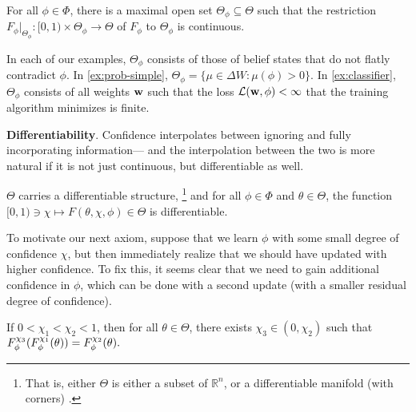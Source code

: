 \begin{prop}
	For all $\phi \in \Phi$,
	there is a maximal open set $\Theta_\phi \subseteq \Theta$ such that
	the restriction $F_{\phi} |_{\Theta_\phi} : [0,1) \times \Theta_\phi \to \Theta$
	of $F_\phi$ to $\Theta_\phi$ is continuous. 	
\end{prop}
In each of our examples, $\Theta_\phi$ consists of those
of belief states that do not flatly contradict $\phi$.
In \cref{ex:prob-simple}, $\Theta_\phi = \{ \mu \in \Delta W : \mu(\phi) > 0\}$.
In \cref{ex:classifier}, $\Theta_\phi$ consists of all weights $\mathbf{w}$ 
such that
the loss $\mathcal L(\mathbf{w}, \phi) < \infty$ that the training algorithm minimizes is finite.



\textbf{Differentiability}.
Confidence interpolates between ignoring and fully incorporating information---
and the interpolation between the two is more natural if it is not just 
continuous, but differentiable as well.

\begin{CFaxioms}
	\item \label{ax:diffble}
	$\Theta$
	carries a differentiable structure,
	\unskip\footnote{
		That is, either 
		$\Theta$ is either a subset of $\mathbb R^n$,
	 	or a differentiable manifold (with corners) 
		\parencite{lee2013smooth,joyce2009manifolds-w/corners}.}
	and for all $\phi \in \Phi$ and $\theta \in \Theta$, 
	the function $[0,1) \ni \chi \mapsto F(\theta,\chi,\phi) \in \Theta$
	is differentiable.
\end{CFaxioms}

To motivate our next axiom,
suppose that we learn $\phi$ with some small degree of confidence $\chi$,
but then immediately realize that we should have updated with higher confidence. 
To fix this, it seems clear that we need to gain additional confidence
in $\phi$, which can be done with a second update 
(with a smaller residual degree of confidence).

\begin{CFaxioms}
	\item 
	If $0 < \chi_1 < \chi_2 < 1$, 
	then for all $\theta \in \Theta$, 
	there exists 
	$\chi_3 \in (0,\chi_2)$
	such that
	$
	F_\phi^{
	\chi_{3}
	}(F_\phi^{\chi_1}(\theta)) = F_\phi^{\chi_2}(\theta).
	$
	\label{ax:seq-for-more}
\end{CFaxioms}

